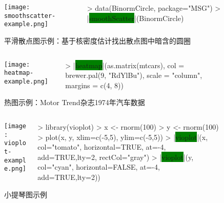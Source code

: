 \begin{frame}[c,fragile]{\subsecname}{}
\begin{figure}
 \begin{columns}
    \begin{column}[c]{.5\textwidth}
        \texttt{[image: smoothscatter-example.png]}
    \end{column}

    \begin{column}[c]{.5\textwidth}
\begin{rcode}
> data(BinormCircle, package="MSG")
> |\colorbox{green}{smoothScatter}|(BinormCircle)
\end{rcode}
    \end{column}
  \end{columns}
  \caption{平滑散点图示例：基于核密度估计找出散点图中暗含的圆圈}
\end{figure}
\end{frame}

\begin{frame}[c,fragile]{\subsecname}{}
\begin{figure}
 \begin{columns}
    \begin{column}[c]{.5\textwidth}
        \texttt{[image: heatmap-example.png]}
    \end{column}

    \begin{column}[c]{.5\textwidth}
\begin{rcode}
> |\colorbox{green}{heatmap}|(as.matrix(mtcars), col = brewer.pal(9, "RdYlBu"), scale = "column", margins = c(4, 8))
\end{rcode}
    \end{column}
  \end{columns}
  \caption{热图示例：Motor Trend杂志1974年汽车数据}
\end{figure}
\end{frame}

\begin{frame}[c,fragile]{\subsecname}{}
\begin{figure}
 \begin{columns}
    \begin{column}[c]{.4\textwidth}
        \texttt{[image: vioplot-example.png]}
    \end{column}

    \begin{column}[c]{.6\textwidth}
\begin{rcode}
> library(vioplot)
> x <- rnorm(100)
> y <- rnorm(100)
> plot(x, y, xlim=c(-5,5), ylim=c(-5,5))
> |\colorbox{green}{vioplot}|(x, col="tomato", horizontal=TRUE, at=-4, add=TRUE,lty=2, rectCol="gray")
> |\colorbox{green}{vioplot}|(y, col="cyan", horizontal=FALSE, at=-4, add=TRUE,lty=2))
\end{rcode}
    \end{column}
  \end{columns}
  \caption{小提琴图示例}
\end{figure}
\end{frame}

